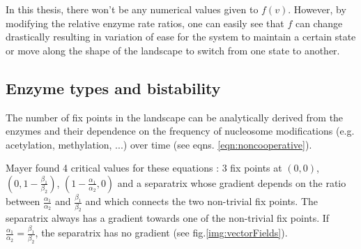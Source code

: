             In this thesis,  there won't be any numerical values given to $f(v)$. However, by modifying the relative enzyme rate ratios, one can easily see that $f$ can change drastically resulting in variation of ease for the system to maintain a certain state or move along the shape of the landscape to switch from one state to another.\\ %
        \subsection{Enzyme types and bistability}
        \label{subsec:EnzymeTypesAndBistability}
            The number of fix points in the landscape can be analytically derived from the enzymes and their dependence on the frequency of nucleosome modifications (e.g. acetylation, methylation, ...) over time (see eqns. \ref{eqn:noncooperative}).

            Mayer found 4 critical values for these equations \cite{mayer2020langevin}: 3 fix points at $(0,0)$, $(0,1-\frac{\beta_1}{\beta_2})$, $(1-\frac{\alpha_1}{\alpha_2},0)$ and a separatrix whose gradient depends on the ratio between $\frac{\alpha_1}{\alpha_2}$ and $\frac{\beta_1}{\beta_2}$ and which connects the two non-trivial fix points. The separatrix always has a gradient towards one of the non-trivial fix points. If $\frac{\alpha_1}{\alpha_2} = \frac{\beta_1}{\beta_2}$, the separatrix has no gradient (see fig.\ref{img:vectorFields}).\\

